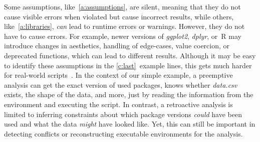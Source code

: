 \noindent Some assumptions, like~\ref{a:assumptions}, are silent, meaning that they do not cause visible errors when violated but cause incorrect results, while others, like~\ref{a:libraries}, \textit{can} lead to runtime errors or warnings. However, they do not have to cause errors. For example, newer versions of \textit{ggplot2}, \textit{dplyr}, or~R may introduce changes in aesthetics, handling of edge-cases, value coercion, or deprecated functions, which can lead to different results.
Although it may be easy to identify these assumptions in the \ref{c:last}~example lines, this gets 
much harder for real-world scripts~\cite{DBLP:conf/msr/SihlerPSTDD24}. %
In the context of our simple example, a preemptive analysis can get the exact version of used packages, knows whether \textit{data.csv} exists, the shape of the data, and more, just by reading the information from the environment and executing the script.
In contrast, a retroactive analysis is limited to inferring constraints about which package versions \textit{could} have been used and what the data \textit{might} have looked like.
Yet, this can still be important in detecting conflicts or reconstructing executable environments for the analysis.
